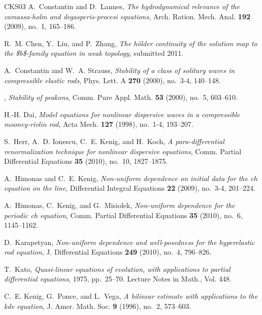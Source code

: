 \documentclass[12pt,reqno]{amsart}
\numberwithin{equation}{section}  %
\numberwithin{figure}{section}
\begin{document}
\begin{thebibliography}{CKS{\etalchar{+}}03}
A.~Constantin and D.~Lannes, \emph{The hydrodynamical relevance of the
  camassa-holm and degasperis-procesi equations}, Arch. Ration. Mech. Anal.
  \textbf{192} (2009), no.~1, 165--186.

 R.~M. Chen, Y.~Liu, and P.~Zhang, \emph{The
    h{\"o}lder continuity of the solution map to the {\$}b{\$}-family equation
in weak topology}, submitted 2011.

A.~Constantin and W.~A. Strauss, \emph{Stability of a class of solitary waves
  in compressible elastic rods}, Phys. Lett. A \textbf{270} (2000), no.~3-4,
  140--148.

\bysame, \emph{Stability of peakons}, Comm. Pure Appl. Math. \textbf{53}
  (2000), no.~5, 603--610.

H.-H. Dai, \emph{Model equations for nonlinear dispersive waves in a
  compressible mooney-rivlin rod}, Acta Mech. \textbf{127} (1998), no.~1-4,
  193--207.

S.~Herr, A.~D. Ionescu, C.~E. Kenig, and H.~Koch, \emph{A para-differential
  renormalization technique for nonlinear dispersive equations}, Comm. Partial
  Differential Equations \textbf{35} (2010), no.~10, 1827--1875.

A.~Himonas and C.~E. Kenig, \emph{Non-uniform dependence on initial data for
  the ch equation on the line}, Differential Integral Equations \textbf{22}
  (2009), no.~3-4, 201--224.

A.~Himonas, C.~Kenig, and G.~Misiolek, \emph{Non-uniform dependence for
  the periodic ch equation}, Comm. Partial Differential Equations \textbf{35}
  (2010), no.~6, 1145--1162.

D.~Karapetyan, \emph{Non-uniform dependence and well-posedness for the
  hyperelastic rod equation}, J. Differential Equations \textbf{249} (2010),
  no.~4, 796--826.

T.~Kato, \emph{Quasi-linear equations of evolution, with applications to
  partial differential equations}, 1975, pp.~25--70. Lecture Notes in Math.,
  Vol. 448.

C.~E. Kenig, G.~Ponce, and L.~Vega, \emph{A bilinear estimate with applications
  to the kdv equation}, J. Amer. Math. Soc. \textbf{9} (1996), no.~2, 573--603.


\end{thebibliography}
\end{document}
